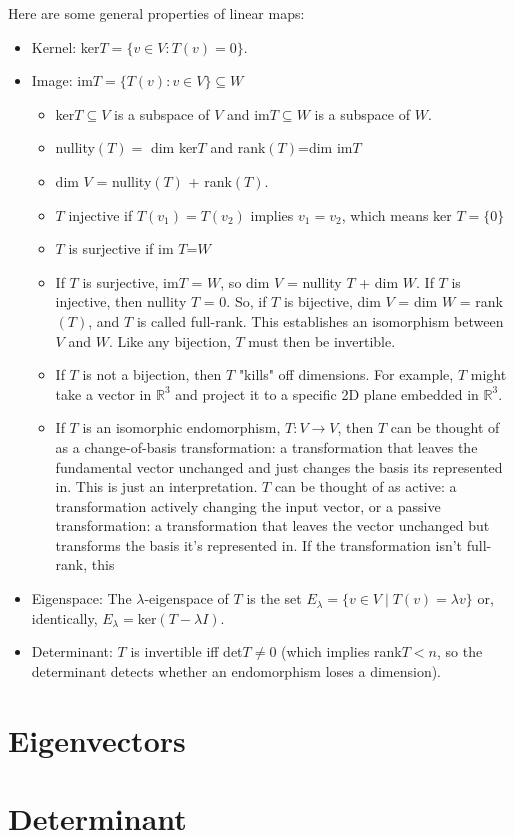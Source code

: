 Here are some general properties of linear maps:
\begin{itemize}
    \item Kernel: ker$T=\{v\in V: T(v)=0\}$.
    \item Image: im$T=\{T(v): v\in V\}\subseteq W$
    \begin{itemize}
        \item ker$T \subseteq V$ is a subspace of $V$ and im$T \subseteq W$ is a subspace of $W$.
        \item nullity$(T)=$ dim ker$T$ and rank$(T)$=dim im$T$
        \item dim $V$ = nullity$(T)$ + rank$(T)$.
        \item $T$ injective if $T(v_1)=T(v_2)$ implies $v_1=v_2$, which means ker $T=\{0\}$\\
        \item $T$ is surjective if im $T$=$W$
        \item If $T$ is surjective, im$T$ = $W$, so dim $V$ = nullity $T$ + dim $W$. If $T$ is injective, then nullity $T$ = 0. So, if $T$ is bijective, dim $V$ = dim $W$ = rank$(T)$, and $T$ is called full-rank. This establishes an isomorphism between $V$ and $W$. Like any bijection, $T$ must then be invertible.
        \item If $T$ is not a bijection, then $T$ "kills" off dimensions. For example, $T$ might take a vector in $\mathbb{R}^3$ and project it to a specific 2D plane embedded in $\mathbb{R}^3$.
        \item If $T$ is an isomorphic endomorphism, $T:V\rightarrow V$, then $T$ can be thought of as a change-of-basis transformation: a transformation that leaves the fundamental vector unchanged and just changes the basis its represented in. This is just an interpretation. $T$ can be thought of as active: a transformation actively changing the input vector, or a passive transformation: a transformation that leaves the vector unchanged but transforms the basis it's represented in. If the transformation isn't full-rank, this
    \end{itemize}
    \item Eigenspace: The $\lambda$-eigenspace of $T$ is the set $E_\lambda=\{v\in V\;|\;T(v)=\lambda v\}$ or, identically, $E_\lambda=$ker$(T-\lambda I)$.
    \item Determinant: $T$ is invertible iff det$T\ne 0$ (which implies rank$T< n$, so the determinant detects whether an endomorphism loses a dimension).
\end{itemize}
\section{Eigenvectors}
\section{Determinant}